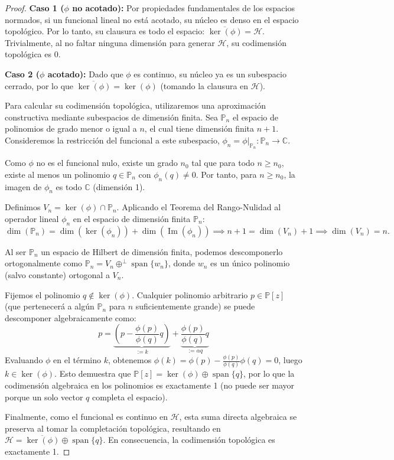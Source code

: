\documentclass[12pt,a4paper]{article}
\theoremstyle{definition}
\theoremstyle{remark}
\newcommand{\Poly}{\mathbb{P}[z]}
\begin{document}
\begin{proof}
  \textbf{Caso 1 ($\phi$ no acotado):} Por propiedades fundamentales de los espacios normados, si un funcional lineal no está acotado, su núcleo es denso en el espacio topológico. Por lo tanto, su clausura es todo el espacio: $\overline{\ker(\phi)} = \mathcal{H}$. Trivialmente, al no faltar ninguna dimensión para generar $\mathcal{H}$, su codimensión topológica es $0$.

  \textbf{Caso 2 ($\phi$ acotado):} Dado que $\phi$ es continuo, su núcleo ya es un subespacio cerrado, por lo que $\overline{\ker(\phi)} = \ker(\phi)$ (tomando la clausura en $\mathcal{H}$).

  Para calcular su codimensión topológica, utilizaremos una aproximación constructiva mediante subespacios de dimensión finita. Sea $\mathbb{P}_n$ el espacio de polinomios de grado menor o igual a $n$, el cual tiene dimensión finita $n+1$.
  Consideremos la restricción del funcional a este subespacio, $\phi_n = \phi|_{\mathbb{P}_n} : \mathbb{P}_n \to \mathbb{C}$.

  Como $\phi$ no es el funcional nulo, existe un grado $n_0$ tal que para todo $n \ge n_0$, existe al menos un polinomio $q \in \mathbb{P}_n$ con $\phi_n(q) \neq 0$. Por tanto, para $n \ge n_0$, la imagen de $\phi_n$ es todo $\mathbb{C}$ (dimensión 1).

  Definimos $V_n = \ker(\phi) \cap \mathbb{P}_n$. Aplicando el Teorema del Rango-Nulidad al operador lineal $\phi_n$ en el espacio de dimensión finita $\mathbb{P}_n$:
  $$ \dim(\mathbb{P}_n) = \dim(\ker(\phi_n)) + \dim(\operatorname{Im}(\phi_n)) \implies n+1 = \dim(V_n) + 1 \implies \dim(V_n) = n. $$

  Al ser $\mathbb{P}_n$ un espacio de Hilbert de dimensión finita, podemos descomponerlo ortogonalmente como $\mathbb{P}_n = V_n \oplus^\perp \operatorname{span}\{w_n\}$, donde $w_n$ es un único polinomio (salvo constante) ortogonal a $V_n$.

  Fijemos el polinomio $q \notin \ker(\phi)$. Cualquier polinomio arbitrario $p \in \Poly$ (que pertenecerá a algún $\mathbb{P}_n$ para $n$ suficientemente grande) se puede descomponer algebraicamente como:
  $$ p = \underbrace{\left( p - \frac{\phi(p)}{\phi(q)} q \right)}_{:= k} + \underbrace{\frac{\phi(p)}{\phi(q)} q}_{:= \alpha q} $$
  Evaluando $\phi$ en el término $k$, obtenemos $\phi(k) = \phi(p) - \frac{\phi(p)}{\phi(q)}\phi(q) = 0$, luego $k \in \ker(\phi)$.
  Esto demuestra que $\Poly = \ker(\phi) \oplus \operatorname{span}\{q\}$, por lo que la codimensión algebraica en los polinomios es exactamente 1 (no puede ser mayor porque un solo vector $q$ completa el espacio).

  Finalmente, como el funcional es continuo en $\mathcal{H}$, esta suma directa algebraica se preserva al tomar la completación topológica, resultando en $\mathcal{H} = \overline{\ker(\phi)} \oplus \operatorname{span}\{q\}$. En consecuencia, la codimensión topológica es exactamente 1.
\end{proof}
\end{document}
